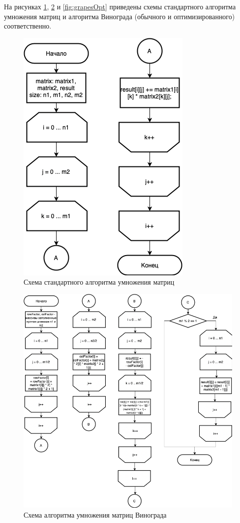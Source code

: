 \documentclass[12pt]{report}
\begin{document}
На рисунках  \ref{fig:base}, \ref{fig:grapes} и \ref{fig:grapesOpt} приведены схемы стандартного алгоритма умножения матриц и алгоритма Винограда (обычного и оптимизированного) соответственно.

\begin{figure}[h!p]
	\centering
	\includegraphics[scale = 0.7]{base.drawio.png}
	\caption{Схема стандартного алгоритма умножения матриц}
	\label{fig:base}
\end{figure}
\begin{figure}[h!p]
	\centering
	\includegraphics[scale = 0.6]{vin.drawio.png}
	\caption{Схема алгоритма умножения матриц Винограда}
	\label{fig:grapes}
\end{figure}
\end{document}
